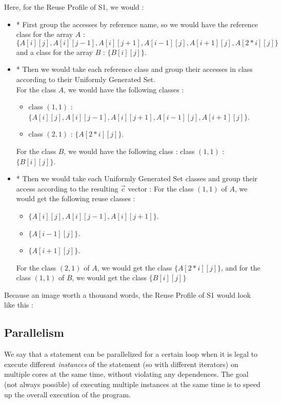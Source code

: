 \documentclass[paper=a4, fontsize=11.5pt]{scrartcl}
\numberwithin{equation}{section}        %
\numberwithin{figure}{section}          %
\numberwithin{table}{section}               %
\begin{document}
        Here, for the Reuse Profile of S1, we would :
        \begin{itemize}
            \item* First group the accesses by reference name, so we would have the reference
                class for the array $A$ : $\{A[i][j],A[i][j-1],A[i][j+1],A[i-1][j],A[i+1][j],A[2*i][j]\}$
                and a class for the array $B$ : $\{B[i][j]\}$.
            \item* Then we would take each reference class and group their accesses in class
                according to their Uniformly Generated Set.\\
                For the class $A$, we would have the following classes :
                    \begin{itemize}
                        \item class $(1,1)$ : $\{A[i][j],A[i][j-1],A[i][j+1],A[i-1][j],A[i+1][j]\}$.
                        \item class $(2,1)$ : $\{A[2*i][j]\}$.
                    \end{itemize}
                For the class $B$, we would have the following class : class $(1,1)$ : $\{B[i][j]\}$.
            \item* Then we would take each Uniformly Generated Set classes and group their
                access according to the resulting $\vec{c}$ vector :
                For the class $(1,1)$ of $A$, we would get the following reuse classes :
                \begin{itemize}
                    \item $\{A[i][j],A[i][j-1],A[i][j+1]\}$.
                    \item $\{A[i-1][j]\}$.
                    \item $\{A[i+1][j]\}$.
                \end{itemize}
                For the class $(2,1)$ of $A$, we would get the class $\{A[2*i][j]\}$, and
                for the class $(1,1)$ of $B$, we would get the class $\{B[i][j]\}$
        \end{itemize}
        
        Because an image worth a thousand words, the Reuse Profile of S1 would look like this :


    \subsection{Parallelism}
        We say that a statement can be parallelized for a certain loop when it is legal to
        execute different \textit{instances} of the statement (so with different iterators)
        on multiple cores at the same time, without violating any dependences. The
        goal (not always possible) of executing multiple instances at the same time is to
        speed up the overall execution of the program.
\end{document}
